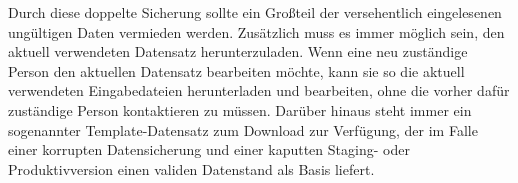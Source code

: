 Durch diese doppelte Sicherung sollte ein Großteil der versehentlich eingelesenen ungültigen Daten vermieden werden. Zusätzlich muss es immer möglich sein, den aktuell verwendeten Datensatz herunterzuladen. Wenn eine neu zuständige Person den aktuellen Datensatz bearbeiten möchte, kann sie so die aktuell verwendeten Eingabedateien herunterladen und bearbeiten, ohne die vorher dafür zuständige Person kontaktieren zu müssen. Darüber hinaus steht immer ein sogenannter Template-Datensatz zum Download zur Verfügung, der im Falle einer korrupten Datensicherung und einer kaputten Staging- oder Produktivversion einen validen Datenstand als Basis liefert.